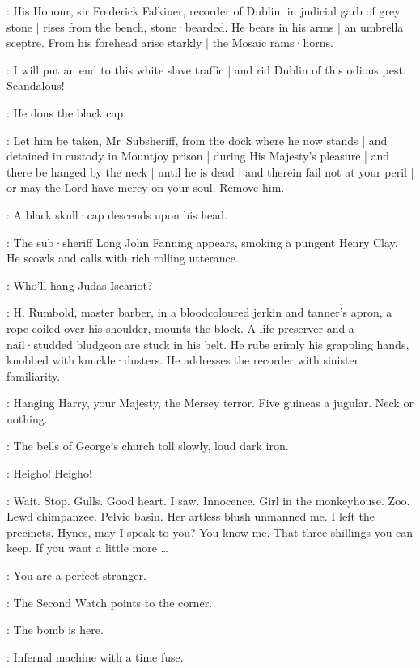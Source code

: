 :
His Honour,
sir Frederick Falkiner,
recorder of Dublin,
in judicial garb of grey stone |
rises from the bench,
stone·bearded.
He bears in his arms |
an umbrella sceptre.
From his forehead arise starkly |
the Mosaic rams·horns.

\Recorder:
I will put an end to this white slave traffic |
and rid Dublin of this odious pest.
Scandalous!

:
He dons the black cap.

\Recorder:
Let him be taken,
Mr~Subsheriff,
from the dock where he now stands |
and detained in custody in Mountjoy prison |
during His Majesty's pleasure |
and there be hanged by the neck |
until he is dead |
and therein fail not at your peril |
or may the Lord have mercy on your soul.
Remove him.

:
A black skull·cap descends upon his head.

:
The sub·sheriff Long John Fanning appears,
smoking a pungent Henry Clay.
He scowls and calls with rich rolling utterance.

\LongJohn:
Who'll hang Judas Iscariot?

:
H. Rumbold,
master barber,
in a bloodcoloured jerkin and tanner's apron,
a rope coiled over his shoulder,
mounts the block.
A life preserver and a nail·studded bludgeon are stuck in his belt.
He rubs grimly his grappling hands,
knobbed with knuckle·dusters.
He addresses the recorder with sinister familiarity.

\Rumbold:
Hanging Harry,
your Majesty,
the Mersey terror.
Five guineas a jugular.
Neck or nothing.

:
The bells of George's church toll slowly,
loud dark iron.

\Bells:
Heigho!
Heigho!

\Bloom:
Wait.
Stop.
Gulls.
Good heart.
I saw.
Innocence.
Girl in the monkeyhouse.
Zoo.
Lewd chimpanzee.
Pelvic basin.
Her artless blush unmanned me.
I left the precincts.
Hynes,
may I speak to you?
You know me.
That three shillings you can keep.
If you want a little more \ldots

\Hynes[1]:
You are a perfect stranger.

:
The Second Watch points to the corner.

\SecondWatch:
The bomb is here.

\FirstWatch:
Infernal machine with a time fuse.

